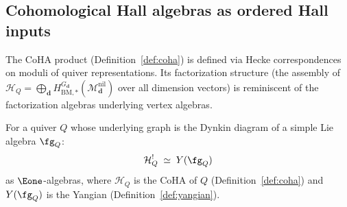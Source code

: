 \subsection{\texorpdfstring{Cohomological Hall algebras as ordered Hall inputs}{Cohomological Hall algebras as ordered Hall inputs}}
\label{sec:coha-structure}

The CoHA product (Definition~\ref{def:coha}) is defined via Hecke
correspondences on moduli of quiver representations. Its factorization
structure (the assembly of $\mathcal{H}_Q = \bigoplus_{\mathbf{d}}
H^{G_{\mathbf{d}}}_{\mathrm{BM},*}(\mathcal{M}_{\mathbf{d}}^{\mathrm{nil}})$
over all dimension vectors) is reminiscent of the factorization algebras
underlying vertex algebras.

\begin{conjecture}
\label{conj:coha-koszul}
For a quiver $Q$ whose underlying graph is the Dynkin diagram of a
simple Lie algebra $\fg_Q$:
\begin{equation}\label{eq:coha-yangian-dual}
\mathcal{H}_Q^! \;\simeq\; Y(\fg_Q)
\end{equation}
as $\Eone$-algebras, where $\mathcal{H}_Q$ is the CoHA of $Q$
\textup{(}Definition~\textup{\ref{def:coha})} and $Y(\fg_Q)$ is the
Yangian \textup{(}Definition~\textup{\ref{def:yangian})}.
\end{conjecture}

